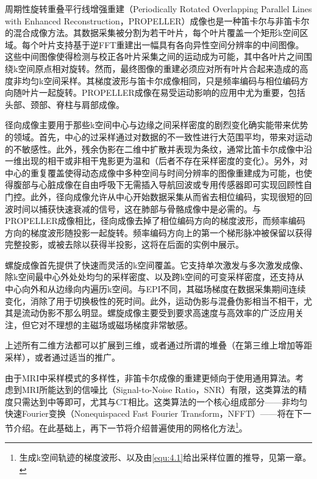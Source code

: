 \documentclass[12pt]{article}
\let\originallautoref\autoref
\renewcommand{\autoref}[1]{\allowbreak\originallautoref{#1}}
\begin{document}
周期性旋转重叠平行线增强重建（Periodically Rotated Overlapping Parallel Lines with Enhanced Reconstruction，PROPELLER）\label{term:PROPELLER}成像也是一种笛卡尔与非笛卡尔的混合成像方法。其数据采集被分割为若干叶片，每个叶片覆盖一个矩形k空间区域。每个叶片支持基于逆FFT重建出一幅具有各向异性空间分辨率的中间图像。这些中间图像使得检测与校正各叶片采集之间的运动成为可能，其中各叶片之间围绕k空间原点相对旋转。然而，最终图像的重建必须应对所有叶片合起来造成的高度非均匀k空间采样。其梯度波形与笛卡尔成像相同，只是频率编码与相位编码方向随叶片一起旋转。PROPELLER成像在易受运动影响的应用中尤为重要，包括头部、颈部、脊柱与肩部成像。

径向成像主要用于那些k空间中心与边缘之间采样密度的剧烈变化确实能带来优势的领域。首先，中心的过采样通过对数据的不一致性进行大范围平均，带来对运动的不敏感性。此外，残余伪影在二维中扩散并表现为条纹，通常比笛卡尔成像中沿一维出现的相干或非相干鬼影更为温和（后者不存在采样密度的变化）。另外，对中心的重复覆盖使得动态成像中多种空间与时间分辨率的图像重建成为可能，也使得腹部与心脏成像在自由呼吸下无需插入导航回波或专用传感器即可实现回顾性自门控。此外，径向成像允许从中心开始数据采集从而省去相位编码，实现很短的回波时间以捕获快速衰减的信号，这在肺部与骨骼成像中是必需的。与PROPELLER成像相比，径向成像去掉了相位编码方向的梯度波形，而频率编码方向的梯度波形随投影一起旋转。频率编码方向上的第一个梯形脉冲被保留以获得完整投影，或被去除以获得半投影，这将在后面的实例中展示。

螺旋成像首先提供了快速而灵活的k空间覆盖。它支持单次激发与多次激发成像、除k空间最中心外处处均匀的采样密度、以及跨k空间的可变采样密度，还支持从中心向外和从边缘向内遍历k空间。与EPI不同，其磁场梯度在数据采集期间连续变化，消除了用于切换极性的死时间。此外，运动伪影与混叠伪影相当不相干，尤其是流动伪影不那么明显。螺旋成像主要受到要求高速度与高效率的广泛应用关注，但它对不理想的主磁场或磁场梯度非常敏感。

上述所有二维方法都可以扩展到三维，或者通过所谓的堆叠（在第三维上增加等距采样），或者通过适当的推广。

由于MRI中采样模式的多样性，非笛卡尔成像的重建更倾向于使用通用算法。考虑到MRI所能达到的信噪比（Signal-to-Noise Ratio，SNR）\label{term:SNR}有限，这类算法的精度只需达到中等即可，尤其与CT相比。这类算法的一个核心组成部分——非均匀快速Fourier变换（Nonequispaced Fast Fourier Transform，NFFT）\label{term:NFFT}——将在下一节介绍。在此基础上，再下一节将介绍普遍使用的网格化方法\footnote{生成k空间轨迹的梯度波形、以及由\autoref{equ:4.1}给出采样位置的推导，见第一章。}。
\end{document}
